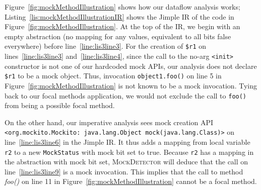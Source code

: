 Figure~\ref{fig:mockMethodIllustration} shows how our dataflow analysis works; Listing~\ref{lis:mockMethodIllustrationIR} shows the Jimple IR of the code in Figure~\ref{fig:mockMethodIllustration}. At the top of the IR, we begin with an empty abstraction (no mapping for any values, equivalent to all bits false everywhere) before line~\ref{line:lis3line3}. For the creation of \texttt{\$r1} on lines~\ref{line:lis3line3} and~\ref{line:lis3line4}, since the call to the no-arg \texttt{<init>} constructor is not one of our hardcoded mock APIs, our analysis does not declare \texttt{\$r1} to be a mock object. 
Thus, invocation \texttt{object1.foo()} on line 5 in Figure~\ref{fig:mockMethodIllustration} is not known to be a mock invocation. Tying back to our focal methods application, we would not exclude the call to \texttt{foo()} from being a possible focal method.

On the other hand, our imperative analysis sees mock creation API \texttt{<org.mockito.Mockito: java.lang.Object mock(java.lang.Class)>} on line~\ref{line:lis3line6} in the Jimple IR. It thus adds a mapping from local variable \texttt{r2} to a new \texttt{MockStatus} with mock bit set to true. Because \texttt{r2} has a mapping in the abstraction with mock bit set, \textsc{MockDetector} will deduce that the call on line~\ref{line:lis3line9} is a mock invocation. This implies that the call to method \textit{foo()} on line 11 in Figure~\ref{fig:mockMethodIllustration} cannot be a focal method.


